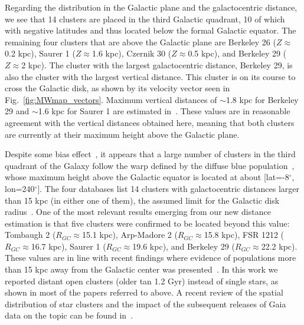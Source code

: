 \documentclass{aa}
\begin{document}
  Regarding the distribution in the Galactic plane and the galactocentric
  distance, we see that 14 clusters are placed in the third Galactic
  quadrant, 10 of which with negative latitudes and thus located below
  the formal Galactic equator. The remaining four clusters that are above the
  Galactic plane are Berkeley 26 ($Z\approx$0.2 kpc), Saurer 1
  ($Z\approx$1.6 kpc), Czernik 30 ($Z\approx$0.5 kpc), and Berkeley
  29 ($Z\approx$2 kpc). The cluster with the largest galactocentric distance,
  Berkeley 29, is also the cluster with the largest vertical distance. This
  cluster is on its course to cross the Galactic disk, as shown by its velocity
  vector seen in Fig.~\ref{fig:MWmap_vectors}. Maximum vertical distances
  of $\sim$1.8 kpc for Berkeley 29 and $\sim$1.6 kpc for Saurer 1 are estimated
  in~\cite{Gaia_Collaboration_2021}. These values are in reasonable agreement with the
  vertical distances obtained here, meaning that both clusters are currently at
  their maximum height above the Galactic plane.

  Despite some bias effect~\citep[e.g., lower dust absorption, particularly
  along the Fitzgerald window;][]{Fitzgerald_1968}, it appears that a large
  number of clusters in the third quadrant of the Galaxy follow the warp defined
  by the diffuse blue population~\citep{Carraro_2005_detection,Moitinho_2006},
  whose maximum height above the Galactic equator is located at about
  [lat=-8$^{\circ}$, lon=240$^{\circ}$].
  The four databases list 14 clusters with galactocentric distances larger
  than 15 kpc (in either one of them), the assumed limit for the Galactic disk
  radius~\citep[see][and references therein]{Carraro_2010}.
  One of the most relevant results emerging from our new distance estimation is
  that five clusters were confirmed to be located beyond this value: Tombaugh 2 ($R_{GC}\approx$15.1 kpc), Arp-Madore 2
  ($R_{GC}\approx$15.8 kpc), FSR 1212 ($R_{GC}\approx$16.7 kpc), Saurer 1
  ($R_{GC}\approx$19.6 kpc), and Berkeley 29 ($R_{GC}\approx$22.2 kpc). These
  values are in line with recent findings where evidence of populations more than
  15 kpc away from the Galactic center was presented~\citep[][and references
  therein]{Liu_2017,Lopez_2018}.
  In this work we   reported distant open clusters (older tan 1.2 Gyr)
  instead of single stars, as shown in most of the papers referred to above.
  A recent review of the spatial distribution of star clusters and
  the impact of the subsequent releases of Gaia data on the topic can be found
  in~\cite{Cantat-Gaudin_2022}.\\
\end{document}
